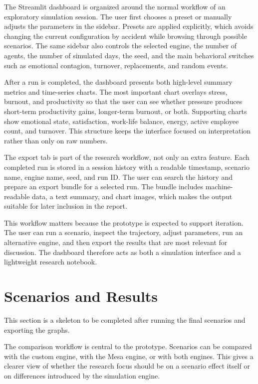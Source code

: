 \documentclass[12pt,a4paper]{article}
\begin{document}
The Streamlit dashboard is organized around the normal workflow of an exploratory simulation session. The user first chooses a preset or manually adjusts the parameters in the sidebar. Presets are applied explicitly, which avoids changing the current configuration by accident while browsing through possible scenarios. The same sidebar also controls the selected engine, the number of agents, the number of simulated days, the seed, and the main behavioral switches such as emotional contagion, turnover, replacements, and random events.

After a run is completed, the dashboard presents both high-level summary metrics and time-series charts. The most important chart overlays stress, burnout, and productivity so that the user can see whether pressure produces short-term productivity gains, longer-term burnout, or both. Supporting charts show emotional state, satisfaction, work-life balance, energy, active employee count, and turnover. This structure keeps the interface focused on interpretation rather than only on raw numbers.

The export tab is part of the research workflow, not only an extra feature. Each completed run is stored in a session history with a readable timestamp, scenario name, engine name, seed, and run ID. The user can search the history and prepare an export bundle for a selected run. The bundle includes machine-readable data, a text summary, and chart images, which makes the output suitable for later inclusion in the report.

This workflow matters because the prototype is expected to support iteration. The user can run a scenario, inspect the trajectory, adjust parameters, run an alternative engine, and then export the results that are most relevant for discussion. The dashboard therefore acts as both a simulation interface and a lightweight research notebook.

\section{Scenarios and Results}
\label{sec:results}

This section is a skeleton to be completed after running the final scenarios and exporting the graphs.

The comparison workflow is central to the prototype. Scenarios can be compared with the custom engine, with the Mesa engine, or with both engines. This gives a clearer view of whether the research focus should be on a scenario effect itself or on differences introduced by the simulation engine.
\end{document}
